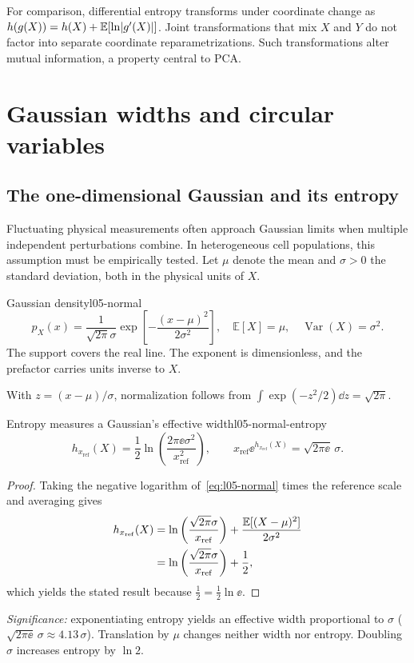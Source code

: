 For comparison, differential entropy transforms under coordinate change as $h(g(X))=h(X)+\mathbb E[\ln\lvert g'(X)\rvert]$. Joint transformations that mix $X$ and $Y$ do not factor into separate coordinate reparametrizations. Such transformations alter mutual information, a property central to PCA.

\section{Gaussian widths and circular variables}
\label{sec:l05-gaussian-circle}
\subsection{The one-dimensional Gaussian and its entropy}
\label{subsec:l05-gaussian}
Fluctuating physical measurements often approach Gaussian limits when multiple independent perturbations combine. In heterogeneous cell populations, this assumption must be empirically tested. Let $\mu$ denote the mean and $\sigma>0$ the standard deviation, both in the physical units of $X$.
\begin{definition}{Gaussian density}{l05-normal}
\begin{equation}
p_X(x)=\frac1{\sqrt{2\pi}\sigma}
\exp\left[-\frac{(x-\mu)^2}{2\sigma^2}\right],
\quad \mathbb E[X]=\mu,\quad \operatorname{Var}(X)=\sigma^2.
\label{eq:l05-normal}
\end{equation}
The support covers the real line. The exponent is dimensionless, and the prefactor carries units inverse to $X$.
\end{definition}
With $z=(x-\mu)/\sigma$, normalization follows from $\int\exp(-z^2/2)\dd z=\sqrt{2\pi}$.

\begin{proposition}{Entropy measures a Gaussian's effective width}{l05-normal-entropy}
\begin{equation}
h_{x_{\mathrm{ref}}}(X)=\frac12
\ln\left(\frac{2\pi\ee\sigma^2}{x_{\mathrm{ref}}^2}\right),
\qquad
x_{\mathrm{ref}}\ee^{h_{x_{\mathrm{ref}}}(X)}=\sqrt{2\pi\ee}\,\sigma.
\label{eq:l05-normal-entropy}
\end{equation}
\end{proposition}
\begin{proof}
Taking the negative logarithm of~\eqref{eq:l05-normal} times the reference scale and averaging gives
\begin{align}
h_{x_{\mathrm{ref}}}(X)
&=\ln\left(\frac{\sqrt{2\pi}\sigma}{x_{\mathrm{ref}}}\right)
 +\frac{\mathbb E[(X-\mu)^2]}{2\sigma^2} \notag\\
&=\ln\left(\frac{\sqrt{2\pi}\sigma}{x_{\mathrm{ref}}}\right)+\frac12,
\label{eq:l05-normal-entropy-proof}
\end{align}
which yields the stated result because $\frac12 = \frac12\ln\ee$.
\end{proof}
\textit{Significance:} exponentiating entropy yields an effective width proportional to $\sigma$ ($\sqrt{2\pi\ee}\,\sigma \approx 4.13\,\sigma$). Translation by $\mu$ changes neither width nor entropy. Doubling $\sigma$ increases entropy by $\ln2$.


